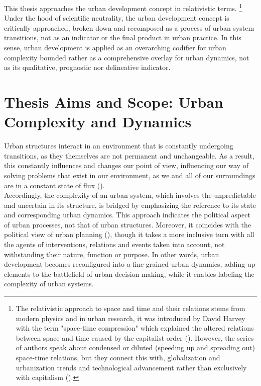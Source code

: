 \documentclass[11pt]{report}
\begin{document}
{{This thesis approaches the urban development concept in relativistic terms.
\footnote{The relativistic approach to space and time and their relations stems from modern physics and in urban research, it was introduced by David Harvey with the term "space-time compression" which explained the altered relations between space and time caused by the capitalist order (\citealt{harvey_condition_2003}). However, the series of authors speak about condensed or diluted (speeding up and spreading out) space-time relations, but they connect this with, globalization and urbanization trends and technological advancement rather than exclusively with capitalism (\href{ref}{\citealt{massey_global_2010}}).}
Under the hood of scientific neutrality, the urban development concept is critically approached, broken down and recomposed as a process of urban system transitions, not as an indicator or the final product in urban practice.
In this sense, urban development is applied as an overarching codifier for urban complexity bounded rather as a comprehensive overlay for urban dynamics, not as its qualitative, prognostic nor delineative indicator.

\section{Thesis Aims and Scope: Urban Complexity and Dynamics}

Urban structures interact in an environment that is constantly undergoing transitions, as they themselves are not permanent and unchangeable. As a result, this constantly influences and changes our point of view, influencing our way of solving problems that exist in our environment, as we and all of our surroundings are in a constant state of flux (\citealt{harvey_condition_2003}).
\\
Accordingly, the complexity of an urban system, which involves the unpredictable and uncertain in its structure, is bridged by emphasizing the reference to its state and corresponding urban dynamics. This approach indicates the political aspect of urban processes, not that of urban structures.  Moreover, it coincides with the political view of urban planning (\href{ref}{\citealt{friedmann_planning_1987}}), though it takes a more inclusive turn with all the agents of interventions, relations and events taken into account, not withstanding their nature, function or purpose. In other words, urban development becomes reconfigured into a fine-grained urban dynamics, adding up elements to the battlefield of urban decision making, while it enables labeling the complexity of urban systems.
\\

}}
\end{document}
